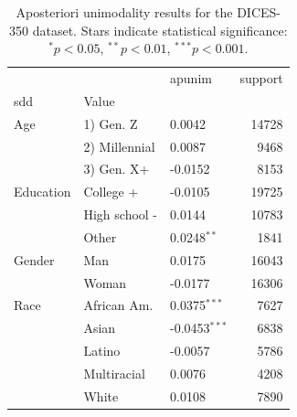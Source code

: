 \begin{table}[t]
\centering
\caption{Aposteriori unimodality results for the DICES-350 dataset. Stars indicate statistical significance: $^{*}p<0.05$, $^{**}p<0.01$, $^{***}p<0.001$.}
\label{tab:dices-350-results}
\begin{tabular}{lllr}
\toprule
 &  & apunim & support \\
\ac{sdd} & Value &  &  \\
\midrule
Age & 1) Gen. Z & 0.0042 & 14728 \\
 & 2) Millennial & 0.0087 & 9468 \\
 & 3) Gen. X+ & -0.0152 & 8153 \\
Education & College + & -0.0105 & 19725 \\
 & High school - & 0.0144 & 10783 \\
 & Other & 0.0248$^{**}$ & 1841 \\
Gender & Man & 0.0175 & 16043 \\
 & Woman & -0.0177 & 16306 \\
Race & African Am. & 0.0375$^{***}$ & 7627 \\
 & Asian & -0.0453$^{***}$ & 6838 \\
 & Latino & -0.0057 & 5786 \\
 & Multiracial & 0.0076 & 4208 \\
 & White & 0.0108 & 7890 \\
\bottomrule
\end{tabular}
\end{table}
